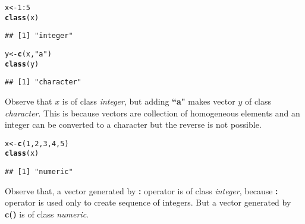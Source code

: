 \documentclass[11pt, a4paper]{article}\usepackage[]{graphicx}\usepackage[]{xcolor}
\makeatletter
\newcommand{\hlnum}[1]{\textcolor[rgb]{0.686,0.059,0.569}{#1}}%
\newcommand{\hlsng}[1]{\textcolor[rgb]{0.192,0.494,0.8}{#1}}%
\newcommand{\hlopt}[1]{\textcolor[rgb]{0,0,0}{#1}}%
\newcommand{\hldef}[1]{\textcolor[rgb]{0.345,0.345,0.345}{#1}}%
\newcommand{\hlkwb}[1]{\textcolor[rgb]{0.69,0.353,0.396}{#1}}%
\newcommand{\hlkwd}[1]{\textcolor[rgb]{0.737,0.353,0.396}{\textbf{#1}}}%
\newenvironment{kframe}{%
 \def\at@end@of@kframe{}%
 \ifinner\ifhmode%
  \def\at@end@of@kframe{\end{minipage}}%
  \begin{minipage}{\columnwidth}%
 \fi\fi%
 \def\FrameCommand##1{\hskip\@totalleftmargin \hskip-\fboxsep
 \colorbox{shadecolor}{##1}\hskip-\fboxsep
     \hskip-\linewidth \hskip-\@totalleftmargin \hskip\columnwidth}%
 \MakeFramed {\advance\hsize-\width
   \@totalleftmargin\z@ \linewidth\hsize
   \@setminipage}}%
 {\par\unskip\endMakeFramed%
 \at@end@of@kframe}
\newenvironment{knitrout}{}{} %
\makeatother
\begin{document}
\flushleft{\smallpencil}

\begin{knitrout}
\color{fgcolor}\begin{kframe}
\begin{alltt}
\hldef{x} \hlkwb{<-} \hlnum{1}\hlopt{:}\hlnum{5}
\hlkwd{class}\hldef{(x)}
\end{alltt}
\begin{verbatim}
## [1] "integer"
\end{verbatim}
\begin{alltt}
\hldef{y} \hlkwb{<-} \hlkwd{c}\hldef{(x,} \hlsng{"a"}\hldef{)}
\hlkwd{class}\hldef{(y)}
\end{alltt}
\begin{verbatim}
## [1] "character"
\end{verbatim}
\end{kframe}
\end{knitrout}

\hspace{1cm} Observe that $x$ is of class \textit{integer}, but adding \textbf{``a"} makes vector $y$ of class \textit{character}. This is because vectors are collection of homogeneous elements and an integer can be converted to a character but the reverse is not possible.

\begin{knitrout}
\color{fgcolor}\begin{kframe}
\begin{alltt}
\hldef{x} \hlkwb{<-} \hlkwd{c}\hldef{(}\hlnum{1}\hldef{,} \hlnum{2}\hldef{,} \hlnum{3}\hldef{,} \hlnum{4}\hldef{,} \hlnum{5}\hldef{)}
\hlkwd{class}\hldef{(x)}
\end{alltt}
\begin{verbatim}
## [1] "numeric"
\end{verbatim}
\end{kframe}
\end{knitrout}

\hspace{1cm} Observe that, a vector generated by \textbf{:} operator is of class \textit{integer}, because \textbf{:} operator is used only to create sequence of integers. But a vector generated by \textbf{c()} is of class \textit{numeric}.
\end{document}
